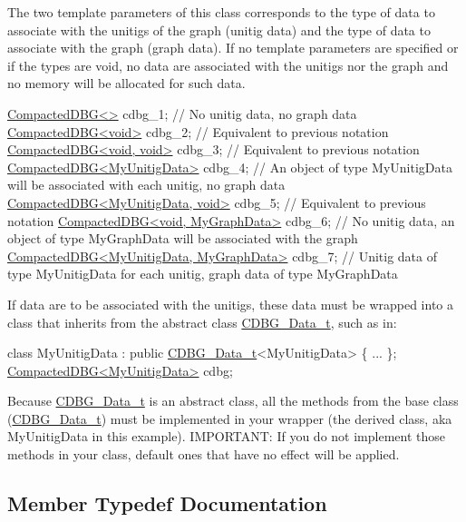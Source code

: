 The two template parameters of this class corresponds to the type of data to associate with the unitigs of the graph (unitig data) and the type of data to associate with the graph (graph data). If no template parameters are specified or if the types are void, no data are associated with the unitigs nor the graph and no memory will be allocated for such data. 
\begin{DoxyCode}
\hyperlink{classCompactedDBG}{CompactedDBG<>} cdbg\_1; \textcolor{comment}{// No unitig data, no graph data}
\hyperlink{classCompactedDBG}{CompactedDBG<void>} cdbg\_2; \textcolor{comment}{// Equivalent to previous notation}
\hyperlink{classCompactedDBG}{CompactedDBG<void, void>} cdbg\_3; \textcolor{comment}{// Equivalent to previous notation}
\hyperlink{classCompactedDBG}{CompactedDBG<MyUnitigData>} cdbg\_4; \textcolor{comment}{// An object of type MyUnitigData will be
       associated with each unitig, no graph data}
\hyperlink{classCompactedDBG}{CompactedDBG<MyUnitigData, void>} cdbg\_5; \textcolor{comment}{// Equivalent to previous notation}
\hyperlink{classCompactedDBG}{CompactedDBG<void, MyGraphData>} cdbg\_6; \textcolor{comment}{// No unitig data, an object of type
       MyGraphData will be associated with the graph}
\hyperlink{classCompactedDBG}{CompactedDBG<MyUnitigData, MyGraphData>} cdbg\_7; \textcolor{comment}{// Unitig data of
       type MyUnitigData for each unitig, graph data of type MyGraphData}
\end{DoxyCode}
 If data are to be associated with the unitigs, these data must be wrapped into a class that inherits from the abstract class \hyperlink{classCDBG__Data__t}{C\+D\+B\+G\+\_\+\+Data\+\_\+t}, such as in\+: 
\begin{DoxyCode}
\textcolor{keyword}{class }MyUnitigData : \textcolor{keyword}{public} \hyperlink{classCDBG__Data__t}{CDBG\_Data\_t}<MyUnitigData> \{ ... \};
\hyperlink{classCompactedDBG}{CompactedDBG<MyUnitigData>} cdbg;
\end{DoxyCode}
 Because \hyperlink{classCDBG__Data__t}{C\+D\+B\+G\+\_\+\+Data\+\_\+t} is an abstract class, all the methods from the base class (\hyperlink{classCDBG__Data__t}{C\+D\+B\+G\+\_\+\+Data\+\_\+t}) must be implemented in your wrapper (the derived class, aka My\+Unitig\+Data in this example). I\+M\+P\+O\+R\+T\+A\+NT\+: If you do not implement those methods in your class, default ones that have no effect will be applied. 

\subsection{Member Typedef Documentation}
\mbox{\label{classCompactedDBG_a7725fc78ad52227df1f70d9b8f44622c}} 
